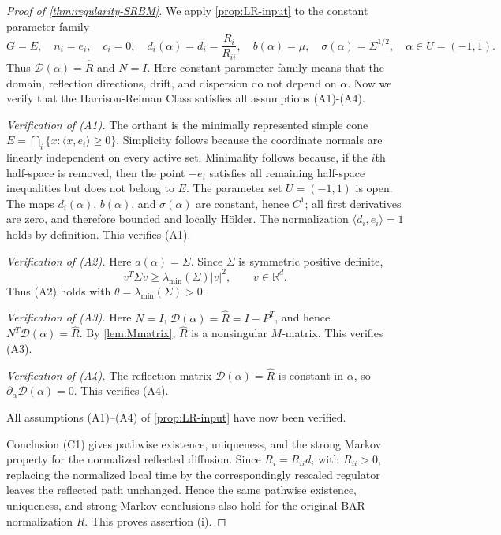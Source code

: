 \documentclass[aihp]{imsart}
\numberwithin{equation}{section}
\theoremstyle{plain}
\theoremstyle{definition}
\newcommand{\R}{\mathbb R}
\newcommand{\1}{\mathbf 1}
\begin{document}
\begin{proof}[Proof of \cref{thm:regularity-SRBM}]
We apply \cref{prop:LR-input} to the constant parameter family
\[
        G=E,\quad
        n_i=e_i,\quad
        c_i=0,\quad
        d_i(\alpha)=d_i=\frac{R_i}{R_{ii}},\quad
        b(\alpha)=\mu,\quad
        \sigma(\alpha)=\Sigma^{1/2},
        \quad \alpha\in U=(-1,1).
\]
Thus $\mathcal D(\alpha)=\widehat R$ and $N=I$. Here constant parameter family means that the domain, reflection directions, drift, and dispersion do
not depend on $\alpha$.  Now we verify that the Harrison-Reiman Class satisfies all assumptions (A1)-(A4).

\smallskip
\noindent\emph{Verification of \textup{(A1)}.}
The orthant is the minimally represented simple cone
$E=\bigcap_i\{x:\langle x,e_i\rangle\ge0\}$.  Simplicity follows because the
coordinate normals are linearly independent on every active set.  Minimality
follows because, if the $i$th half-space is removed, then the point $-e_i$
satisfies all remaining half-space inequalities but does not belong to $E$.  The
parameter set $U=(-1,1)$ is open.  The maps $d_i(\alpha)$, $b(\alpha)$, and
$\sigma(\alpha)$ are constant, hence $C^1$; all first derivatives are zero, and
therefore bounded and locally H\"older.  The normalization
$\langle d_i,e_i\rangle=1$ holds by definition.  This verifies \textup{(A1)}.

\smallskip
\noindent\emph{Verification of \textup{(A2)}.}
Here $a(\alpha)=\Sigma$.  Since $\Sigma$ is symmetric positive definite,
\[
        v^T\Sigma v
        \ge
        \lambda_{\min}(\Sigma)|v|^2,
        \qquad v\in\R^d .
\]
Thus \textup{(A2)} holds with $\theta=\lambda_{\min}(\Sigma)>0$.

\smallskip
\smallskip
\noindent\emph{Verification of \textup{(A3)}.}
Here $N=I$, $\mathcal D(\alpha)=\widehat R=I-P^T$, and hence
$N^T\mathcal D(\alpha)=\widehat R$.  By \cref{lem:Mmatrix}, $\widehat R$ is a
nonsingular $M$-matrix.  This verifies \textup{(A3)}.

\smallskip
\noindent\emph{Verification of \textup{(A4)}.}
The reflection matrix $\mathcal D(\alpha)=\widehat R$ is constant in $\alpha$, so
$\partial_\alpha\mathcal D(\alpha)=0$.  This verifies \textup{(A4)}.

All assumptions \textup{(A1)}--\textup{(A4)} of \cref{prop:LR-input} have now
been verified.

Conclusion \textup{(C1)} gives pathwise existence, uniqueness, and the strong
Markov property for the normalized reflected diffusion.  Since
$R_i=R_{ii}d_i$ with $R_{ii}>0$, replacing the normalized local time by the
correspondingly rescaled regulator leaves the reflected path unchanged.  Hence
the same pathwise existence, uniqueness, and strong Markov conclusions also hold
for the original BAR normalization $R$.  This proves assertion \textup{(i)}.


\end{proof}
\end{document}
